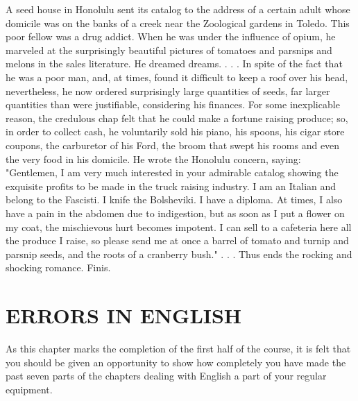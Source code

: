 \documentclass[10pt]{article}
\begin{document}
A seed house in Honolulu sent its catalog to the address of a certain adult whose domicile was on the banks of a creek near the Zoological gardens in Toledo. This poor fellow was a drug addict. When he was under the influence of opium, he marveled at the surprisingly beautiful pictures of tomatoes and parsnips and melons in the sales literature. He dreamed dreams. . . . In spite of the fact that he was a poor man, and, at times, found it difficult to keep a roof over his head, nevertheless, he now ordered surprisingly large quantities of seeds, far larger quantities than were justifiable, considering his finances. For some inexplicable reason, the credulous chap felt that he could make a fortune raising produce; so, in order to collect cash, he voluntarily sold his piano, his spoons, his cigar store coupons, the carburetor of his Ford, the broom that swept his rooms and even the very food in his domicile. He wrote the Honolulu concern, saying: "Gentlemen, I am very much interested in your admirable catalog showing the exquisite profits to be made in the truck raising industry. I am an Italian and belong to the Fascisti. I knife the Bolsheviki. I have a diploma. At times, I also have a pain in the abdomen due to indigestion, but as soon as I put a flower on my coat, the mischievous hurt becomes impotent. I can sell to a cafeteria here all the produce I raise, so please send me at once a barrel of tomato and turnip and parsnip seeds, and the roots of a cranberry bush." . . . Thus ends the rocking and shocking romance. Finis.

\section*{ERRORS IN ENGLISH}
As this chapter marks the completion of the first half of the course, it is felt that you should be given an opportunity to show how completely you have made the past seven parts of the chapters dealing with English a part of your regular equipment.
\end{document}
